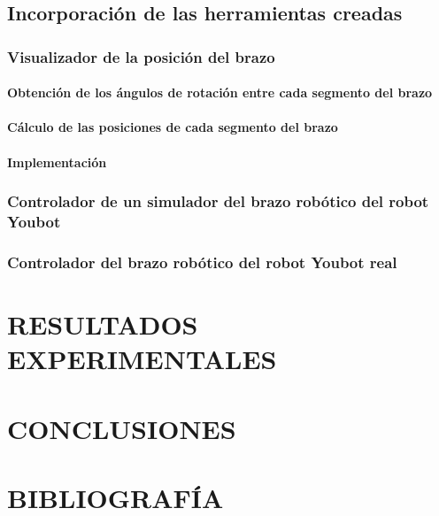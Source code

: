 \documentclass[10pt, a4paper]{report}
\begin{document}
\section{Incorporación de las herramientas creadas}

\subsection{Visualizador de la posición del brazo}

\subsubsection{Obtención de los ángulos de rotación entre cada segmento del brazo}

\subsubsection{Cálculo de las posiciones de cada segmento del brazo}

\subsubsection{Implementación}

\subsection{Controlador de un simulador del brazo robótico del robot Youbot}

\subsection{Controlador del brazo robótico del robot Youbot real}


\chapter{RESULTADOS EXPERIMENTALES}



\chapter{CONCLUSIONES}



\chapter{BIBLIOGRAFÍA}
\end{document}
